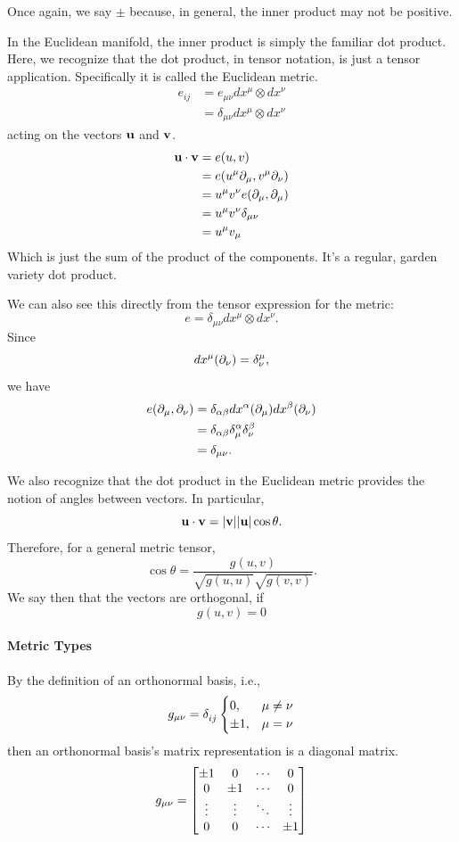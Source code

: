 	Once again, we say $\pm$ because, in general, the inner product may 
	not be positive.

	In the Euclidean manifold, the inner product is simply the familiar dot product.
	Here, we recognize that the dot product, in tensor notation, is just a
	tensor application. Specifically it is called the Euclidean metric.
	\begin{align*}
		e_{ij}
		&=
		e_{\mu\nu}dx^\mu\otimes dx^\nu\\
		&=\delta_{\mu\nu}dx^\mu\otimes dx^\nu
	\end{align*}
	acting on the vectors $\vb{u}$ and $\vb{v}$.
	\begin{align*}
		\vb{u}\cdot\vb{v}
		&= e(u,v)\\
		&= e(u^\mu\partial_\mu,v^\mu\partial_\nu)\\
		&= u^\mu v^\nu e(\partial_\mu,\partial_\mu)\\
		&= u^\mu v^\nu \delta_{\mu\nu} \\
		&= u^\mu v_\mu 
	\end{align*}
	Which is just the sum of the product of the components. It's a regular, garden variety
	dot product.

	We can also see this directly from the tensor expression for the metric:
	\[
		e
		=
		\delta_{\mu\nu}dx^\mu\otimes dx^\nu.
	\]
	Since
	\[
		dx^\mu(\partial_\nu)=\delta^\mu_\nu,
	\]
	we have
	\begin{align*}
		e(\partial_\mu,\partial_\nu)
		&=
		\delta_{\alpha\beta}
		dx^\alpha(\partial_\mu)
		dx^\beta(\partial_\nu)\\
		&=
		\delta_{\alpha\beta}
		\delta^\alpha_\mu
		\delta^\beta_\nu\\
		&=
		\delta_{\mu\nu}.
	\end{align*}

	We also recognize that the dot product in the Euclidean metric provides
	the notion of angles between vectors. In particular,
	\[
		\vb{u}\cdot\vb{v}
		=
		\abs{\vb{v}}\abs{\vb{u}}\cos\theta.
	\]
	Therefore, for a general metric tensor,
	\[
		\cos\theta
		=
		\frac{g(u,v)}
		{\sqrt{g(u,u)}\sqrt{g(v,v)}}.
	\]
	We say then that the vectors are orthogonal, if 
	\[
		g(u,v) = 0
	\]
	\paragraph{Metric Types}
		By the definition of an orthonormal basis, i.e.,
		\[
			g_{\mu\nu} = \tensor{\delta}{_{ij}}
			\begin{cases}
				0, &\mu\neq\nu\\
				\pm 1,&\mu=\nu
			\end{cases}
		\]
		then an orthonormal basis's matrix representation is a diagonal matrix.
		\[
			g_{\mu\nu}
			=
			\bmqty{
				\pm 1      & 0          & \cdots & 0 \\
				0          & \pm 1      & \cdots & 0 \\
				\vdots     & \vdots     & \ddots & \vdots \\
				0          & 0          & \cdots & \pm 1
			}
		\]

